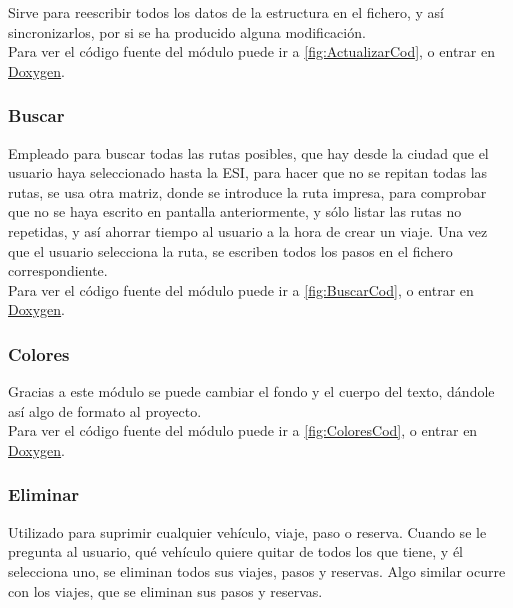 Sirve para reescribir todos los datos de la estructura en el fichero, y así sincronizarlos, por si se ha producido alguna modificación.\\

Para ver el código fuente del módulo puede ir a \ref{fig:ActualizarCod}, o entrar en \href{DOC_DOXYGEN/actualizar_8h_source.html}{Doxygen}.
\label{fig:Actualizar}

\subsubsection{Buscar}

Empleado para buscar todas las rutas posibles, que hay desde la ciudad que el usuario haya seleccionado
hasta la ESI, para hacer que no se repitan
todas las rutas, se usa otra matriz, donde se introduce la ruta impresa, para comprobar que no se haya escrito en pantalla anteriormente, y sólo listar las rutas no repetidas,
y así ahorrar tiempo al usuario a la hora de crear un viaje. Una vez que el usuario selecciona la ruta, se escriben todos los pasos en el fichero correspondiente.\\

Para ver el código fuente del módulo puede ir a \ref{fig:BuscarCod}, o entrar en \href{DOC_DOXYGEN/buscar_8h_source.html}{Doxygen}.
\label{fig:Buscar}

\subsubsection{Colores}

Gracias a este módulo se puede cambiar el fondo y el cuerpo del texto, dándole así algo de formato al proyecto.\\

Para ver el código fuente del módulo puede ir a \ref{fig:ColoresCod}, o entrar en \href{DOC_DOXYGEN/colores_8h_source.html}{Doxygen}.
\label{fig:Colores}

\subsubsection{Eliminar}

Utilizado para suprimir cualquier vehículo, viaje, paso o reserva. Cuando se le pregunta al usuario, qué vehículo quiere quitar de todos los que tiene,
y él selecciona uno, se eliminan todos sus viajes, pasos y reservas. Algo similar ocurre con los viajes, que se eliminan sus pasos y reservas.\\

